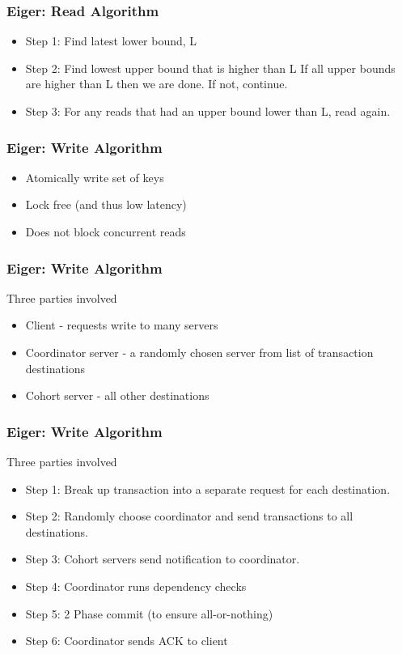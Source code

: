 \documentclass{beamer}
\begin{document}
\begin{frame}
\frametitle{Eiger: Read Algorithm}
\begin{itemize}
\item Step 1: Find latest lower bound, L
\item Step 2: Find lowest upper bound that is higher than L
\newline If all upper bounds are higher than L then we are done.  If not, continue. 
\item Step 3: For any reads that had an upper bound lower than L, read again.
\end{itemize}  
\end{frame}


\begin{frame}
\frametitle{Eiger: Write Algorithm}
\begin{itemize}
\item Atomically write set of keys
\item Lock free (and thus low latency)
\item Does not block concurrent reads
\end{itemize}  
\end{frame}



\begin{frame}
\frametitle{Eiger: Write Algorithm}
Three parties involved
\begin{itemize}
	\item Client - requests write to many servers
	\item Coordinator server - a randomly chosen server from list of transaction destinations
	\item Cohort server - all other destinations
\end{itemize}  
\end{frame}



\begin{frame}
\frametitle{Eiger: Write Algorithm}
Three parties involved
\begin{itemize}
	\item Step 1: Break up transaction into a separate request for each destination.
	\item Step 2: Randomly choose coordinator and send transactions to all destinations.
	\item Step 3: Cohort servers send notification to coordinator.
	\item Step 4: Coordinator runs dependency checks
	\item Step 5: 2 Phase commit (to ensure all-or-nothing)
	\item Step 6: Coordinator sends ACK to client
\end{itemize}  
\end{frame}
\end{document}
